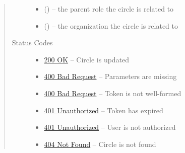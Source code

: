 \documentclass[letterpaper,10pt,english]{sphinxmanual}
\begin{document}
\begin{fulllineitems}
\begin{quote}
\begin{description}
\begin{itemize}
\item {} 
 () -- the parent role the circle is related to

\item {} 
 () -- the organization the circle is related to

\end{itemize}

\item[{Status Codes}] \leavevmode\begin{itemize}
\item {} 
\href{http://www.w3.org/Protocols/rfc2616/rfc2616-sec10.html\#sec10.2.1}{200 OK} -- Circle is updated

\item {} 
\href{http://www.w3.org/Protocols/rfc2616/rfc2616-sec10.html\#sec10.4.1}{400 Bad Request} -- Parameters are missing

\item {} 
\href{http://www.w3.org/Protocols/rfc2616/rfc2616-sec10.html\#sec10.4.1}{400 Bad Request} -- Token is not well-formed

\item {} 
\href{http://www.w3.org/Protocols/rfc2616/rfc2616-sec10.html\#sec10.4.2}{401 Unauthorized} -- Token has expired

\item {} 
\href{http://www.w3.org/Protocols/rfc2616/rfc2616-sec10.html\#sec10.4.2}{401 Unauthorized} -- User is not authorized

\item {} 
\href{http://www.w3.org/Protocols/rfc2616/rfc2616-sec10.html\#sec10.4.5}{404 Not Found} -- Circle is not found

\end{itemize}

\end{description}\end{quote}

\end{fulllineitems}
\end{document}
